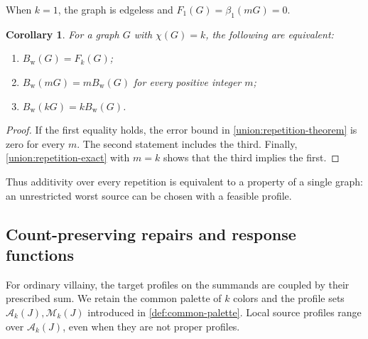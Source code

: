 \documentclass[11pt,reqno]{amsart}
\numberwithin{equation}{section}
\newtheorem{corollary}[theorem]{Corollary}
\theoremstyle{definition}
\theoremstyle{remark}
\begin{document}
When $k=1$, the graph is edgeless and $F_1(G)=\beta_1(mG)=0$.


\begin{corollary}\label{union:all-repetition-equality}
For a graph $G$ with $\chi(G)=k$, the following are equivalent:
\begin{enumerate}
\item $B_{\mathrm w}(G)=F_k(G)$;
\item $B_{\mathrm w}(mG)=mB_{\mathrm w}(G)$ for every positive integer $m$;
\item $B_{\mathrm w}(kG)=kB_{\mathrm w}(G)$.
\end{enumerate}
\end{corollary}

\begin{proof}
If the first equality holds, the error bound in
\cref{union:repetition-theorem} is zero for every $m$.
The second statement includes the third.  Finally,
\eqref{union:repetition-exact} with $m=k$ shows that the third implies
the first.
\end{proof}

Thus additivity over every repetition is equivalent to a property of
a single graph: an unrestricted worst source can be chosen with a
feasible profile.

\subsection{Count-preserving repairs and response functions}

For ordinary villainy, the target profiles on the summands are coupled
by their prescribed sum. We retain the common palette of $k$ colors
and the profile sets $\mathcal A_k(J),\mathcal M_k(J)$ introduced
in \cref{def:common-palette}. Local source profiles range
over $\mathcal A_k(J)$, even when they are not proper profiles.
\end{document}
